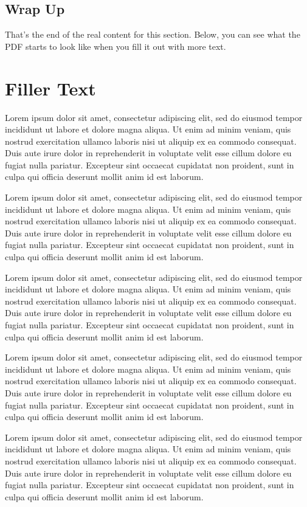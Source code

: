 \documentclass[11pt,twoside,a4paper]{article}
\begin{document}
\subsection{Wrap Up}
That's the end of the real content for this section. Below, you can see what the PDF starts to look like when you fill it out with more text.


\section{Filler Text}
Lorem ipsum dolor sit amet, consectetur adipiscing elit, sed do eiusmod tempor incididunt ut labore et dolore magna aliqua. Ut enim ad minim veniam, quis nostrud exercitation ullamco laboris nisi ut aliquip ex ea commodo consequat. Duis aute irure dolor in reprehenderit in voluptate velit esse cillum dolore eu fugiat nulla pariatur. Excepteur sint occaecat cupidatat non proident, sunt in culpa qui officia deserunt mollit anim id est laborum.

Lorem ipsum dolor sit amet, consectetur adipiscing elit, sed do eiusmod tempor incididunt ut labore et dolore magna aliqua. Ut enim ad minim veniam, quis nostrud exercitation ullamco laboris nisi ut aliquip ex ea commodo consequat. 
Duis aute irure dolor in reprehenderit in voluptate velit esse cillum dolore eu fugiat nulla pariatur. Excepteur sint occaecat cupidatat non proident, sunt in culpa qui officia deserunt mollit anim id est laborum.

Lorem ipsum dolor sit amet, consectetur adipiscing elit, sed do eiusmod tempor incididunt ut labore et dolore magna aliqua. Ut enim ad minim veniam, quis nostrud exercitation ullamco laboris nisi ut aliquip ex ea commodo consequat. 
Duis aute irure dolor in reprehenderit in voluptate velit esse cillum dolore eu fugiat nulla pariatur. Excepteur sint occaecat cupidatat non proident, sunt in culpa qui officia deserunt mollit anim id est laborum.

Lorem ipsum dolor sit amet, consectetur adipiscing elit, sed do eiusmod tempor incididunt ut labore et dolore magna aliqua. Ut enim ad minim veniam, quis nostrud exercitation ullamco laboris nisi ut aliquip ex ea commodo consequat. 
Duis aute irure dolor in reprehenderit in voluptate velit esse cillum dolore eu fugiat nulla pariatur. Excepteur sint occaecat cupidatat non proident, sunt in culpa qui officia deserunt mollit anim id est laborum.

Lorem ipsum dolor sit amet, consectetur adipiscing elit, sed do eiusmod tempor incididunt ut labore et dolore magna aliqua. Ut enim ad minim veniam, quis nostrud exercitation ullamco laboris nisi ut aliquip ex ea commodo consequat. 
Duis aute irure dolor in reprehenderit in voluptate velit esse cillum dolore eu fugiat nulla pariatur. Excepteur sint occaecat cupidatat non proident, sunt in culpa qui officia deserunt mollit anim id est laborum.
\end{document}
